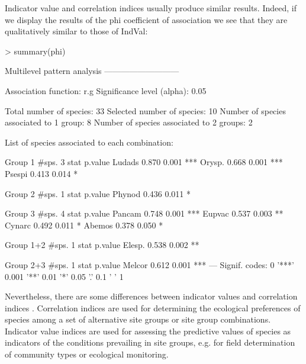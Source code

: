 \documentclass[11pt,a4paper]{article}
\begin{document}
Indicator value and correlation indices usually produce similar results. Indeed, if we display the results of the phi coefficient of association we see that they are qualitatively similar to those of IndVal: 
\begin{Schunk}
\begin{Sinput}
> summary(phi)
\end{Sinput}
\begin{Soutput}
 Multilevel pattern analysis
 ---------------------------

 Association function: r.g
 Significance level (alpha): 0.05

 Total number of species: 33
 Selected number of species: 10 
 Number of species associated to 1 group: 8 
 Number of species associated to 2 groups: 2 

 List of species associated to each combination: 

 Group 1  #sps.  3 
        stat p.value    
Ludads 0.870   0.001 ***
Orysp. 0.668   0.001 ***
Psespi 0.413   0.014 *  

 Group 2  #sps.  1 
        stat p.value  
Phynod 0.436   0.011 *

 Group 3  #sps.  4 
        stat p.value    
Pancam 0.748   0.001 ***
Eupvac 0.537   0.003 ** 
Cynarc 0.492   0.011 *  
Abemos 0.378   0.050 *  

 Group 1+2  #sps.  1 
        stat p.value   
Elesp. 0.538   0.002 **

 Group 2+3  #sps.  1 
        stat p.value    
Melcor 0.612   0.001 ***
---
Signif. codes:  0 '***' 0.001 '**' 0.01 '*' 0.05 '.' 0.1 ' ' 1 
\end{Soutput}
\end{Schunk}
Nevertheless, there are some differences between indicator values and correlation indices \citep{DeCaceres2008}\citep{DeCaceres2009}. Correlation indices are used for determining the ecological preferences of species among a set of alternative site groups or site group combinations. Indicator value indices are used for assessing the predictive values of species as indicators of the conditions prevailing in site groups, e.g. for field determination of community types or ecological monitoring.
\end{document}
